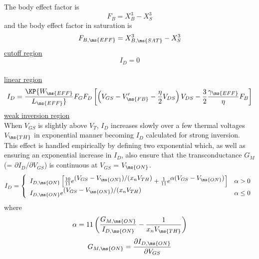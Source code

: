 {The body effect factor is
\begin{equation}
F_B = X^3_B - X^3_S
\end{equation}
and the body effect factor in saturation is
\begin{equation}
F_{B,\ms{EFF}} = X^3_{B,\ms{SAT}} - X^3_S
\end{equation}
\underline{cutoff region}
\begin{equation}
I_{D} = 0
\end{equation}\\[0.2in]
%
%
\noindent\underline{linear region} 
\begin{equation}
 I_{D} =  \KP {{W_{\ms{EFF}}}\over{ L_{\ms{EFF}}}} F_G F_D
           \left[ \left( V_{GS} - V'_{\ms{FB}}
           - {{\textstyle \eta}\over{\textstyle 2}} V_{DS}
       \right) V_{DS}
           - {{\textstyle 3}\over{\textstyle 2}}
           {{\textstyle\gamma_{\ms{EFF}}}\over{\textstyle \eta}} F_B
           \right]
      \label{mos2linearids}
\end{equation}
%
%
\underline{weak inversion region}
\\[0.1in]
When $V_{GS}$ is slightly above $V_T$, $I_{D}$ increases slowly
over a few thermal voltages $V_{\ms{TH}}$ in exponential manner
becoming $I_{D}$ calculated for strong inversion. This effect is
handled empirically by defining two exponential which, as well as
ensuring an exponential increase in $I_{D}$, also ensure that the
transconductance $G_M$ (= $\partial I_{D}/\partial V_{GS}$) is
continuous at $V_{GS}$ = $V_{\ms{ON}}$.
\begin{equation}
I_{D} = \left\{ \begin{array}{ll}
         I_{D,\ms{ON}} \left[ {{10}\over{11}} e^{\textstyle
                     (V_{GS}-V_{\ms{ON}})/(x_nV_{TH})}
       + {{1}\over{11}} e^{\textstyle \alpha (V_{GS}-V_{\ms{ON}})} \right]
          &  \alpha > 0 \\
         I_{D,\ms{ON}} e^{\textstyle (V_{GS}-V_{\ms{ON}})/(x_nV_{TH})}
         &  \alpha \le 0
         \end{array} \right. %
\end{equation}
where
\begin{equation}
\alpha=11\left({{\textstyle G_{M,\ms{ON}}}\over {\textstyle
I_{D,\ms{ON}}}}
       -{{\textstyle 1}\over {\textstyle x_nV_{\ms{TH}}}}\right)
\end{equation}
\begin{equation}
G_{M,\ms{ON}} = {{\partial I_{D,\ms{ON}}} \over {\partial V_{GS}}}

\end{equation}}
